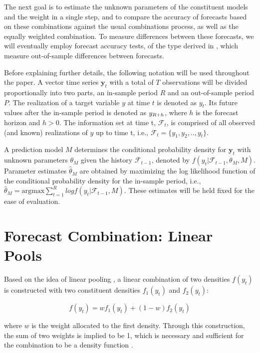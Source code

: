 \documentclass{monashthesis}
\begin{document}
The next goal is to estimate the unknown parameters of the constituent models and the weight in a single step, and to compare the accuracy of forecasts based on these combinations against the usual combinations process, as well as the equally weighted combination. To measure differences between these forecasts, we will eventually employ forecast accuracy tests, of the type derived in \textcite{W96}, which measure out-of-sample differences between forecasts.

Before explaining further details, the following notation will be used throughout the paper. A vector time series \(\textbf{y}_t\) with a total of \(T\) observations will be divided proportionally into two parts, an in-sample period \(R\) and an out-of-sample period \(P\). The realization of a target variable \(y\) at time \(t\) is denoted as \(y_{t}\). Its future values after the in-sample period is denoted as \(y_{\small{R+h}}\), where \(h\) is the forecast horizon and \(h>0\). The information set at time t, \(\mathcal{F}_t\), is comprised of all observed (and known) realizations of \(y\) up to time t, i.e., \(\mathcal{F}_t = \{y_1, y_2, .., y_t\}\).

A prediction model \(M\) determines the conditional probability density for \(\textbf{y}_t\) with unknown parameters \(\theta_M\) given the history \(\mathcal{F}_{t-1}\), denoted by \(f(y_t|\mathcal{F}_{t-1}, \theta_M, M)\). Parameter estimates \(\hat\theta_M\) are obtained by maximizing the log likelihood function of the conditional probability density for the in-sample period, i.e., \(\hat\theta_M = \text{argmax} \sum^R_{t=1} log f(y_t|\mathcal{F}_{t-1}, M)\). These estimates will be held fixed for the ease of evaluation.

\hypertarget{forecast-combination-linear-pools}{%
\section{Forecast Combination: Linear Pools}\label{forecast-combination-linear-pools}}

Based on the idea of linear pooling \autocite{BG69,HM07,GA11}, a linear combination of two densities \(f(y_t)\) is constructed with two constituent densities \(f_1(y_t)\) and \(f_2(y_t)\):

\begin{equation}
f(y_t) = wf_1(y_t) + (1-w)f_2(y_t)
\end{equation}

where \(w\) is the weight allocated to the first density. Through this construction, the sum of two weights is implied to be 1, which is necessary and sufficient for the combination to be a density function \autocite{GA11}.
\end{document}
